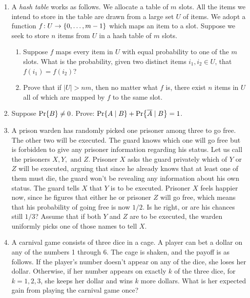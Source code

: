 \documentclass[11pt,onecolumn]{article}
\newcommand{\set}[1]{\ensuremath{\left\{#1\right\}}\xspace}
\newcommand{\mypr}[1]{\ensuremath{\text{Pr}\left\{#1\right\}}\xspace}
\let\originalleft\left
\let\originalright\right
\renewcommand{\left}{\mathopen{}\mathclose\bgroup\originalleft}
\renewcommand{\right}{\aftergroup\egroup\originalright}
\begin{document}
\begin{enumerate}
What is the probability that you bankrupt your friend within $10$ tosses of the coin?

\item A \emph{hash table} works as follows. We allocate a table of $m$ slots. All the items we intend to store in the table are drawn from a large set $U$ of items. We adopt a function $f\!:U\to\set{0,\ldots,m-1}$ which maps an item to a slot. Suppose we seek to store $n$ items from $U$ in a hash table of $m$ slots.
\begin{enumerate}
\item Suppose $f$ maps every item in $U$ with equal probability to one of the $m$ slots. What is the probability, given two distinct items $i_1,i_2 \in U$, that $f(i_1) = f(i_2)$?

\item Prove that if $|U| > nm$, then no matter what $f$ is, there exist $n$ items in $U$ all of which are mapped by $f$ to the same slot.
\end{enumerate}

\item Suppose $\mypr{B}\not= 0$. Prove: $\mypr{A\mid B} + \mypr{\overline{A}\mid B} = 1$.

\item A prison warden has randomly picked one prisoner among three to go free. The other two will be executed. The guard knows which one will go free but is forbidden to give any prisoner information regarding his status. Let us call the prisoners $X, Y, \text{ and } Z$. Prisoner $X$ asks the guard privately which of $Y$ or $Z$ will be executed, arguing that since he already knows that at least one of them must die, the guard won't be revealing any information about his own status. The guard tells $X$ that $Y$ is to be executed. Prisoner $X$ feels happier now, since he figures that either he or prisoner $Z$ will go free, which means that his probability of going free is now $1/2$. Is he right, or are his chances still $1/3$? Assume that if both $Y$ and $Z$ are to be executed, the warden uniformly picks one of those names to tell $X$.

\item A carnival game consists of three dice in a cage. A player can bet a dollar on any of the numbers 1 through 6. The cage is shaken, and the payoff is as follows. If the player's number doesn't appear on any of the dice, she loses her dollar. Otherwise, if her number appears on exactly $k$ of the three dice, for $k = 1, 2, 3$, she keeps her dollar and wins $k$ more dollars. What is her expected gain from playing the carnival game once?


\end{enumerate}
\end{document}
